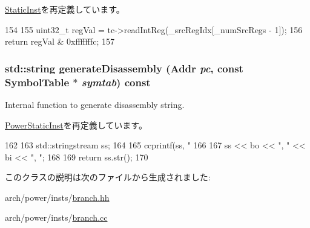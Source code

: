 \hyperlink{classStaticInst_ad126194d9e34405bfc297b8b028f640d}{StaticInst}を再定義しています。


\begin{DoxyCode}
154 {
155     uint32_t regVal = tc->readIntReg(_srcRegIdx[_numSrcRegs - 1]);
156     return regVal & 0xfffffffc;
157 }
\end{DoxyCode}
\hypertarget{classPowerISA_1_1BranchRegCond_a95d323a22a5f07e14d6b4c9385a91896}{
\subsubsection[{generateDisassembly}]{\setlength{\rightskip}{0pt plus 5cm}std::string generateDisassembly ({\bf Addr} {\em pc}, \/  const SymbolTable $\ast$ {\em symtab}) const}}
\label{classPowerISA_1_1BranchRegCond_a95d323a22a5f07e14d6b4c9385a91896}
Internal function to generate disassembly string. 

\hyperlink{classPowerISA_1_1PowerStaticInst_a95d323a22a5f07e14d6b4c9385a91896}{PowerStaticInst}を再定義しています。


\begin{DoxyCode}
162 {
163     std::stringstream ss;
164 
165     ccprintf(ss, "%
166 
167     ss << bo << ", " << bi << ", ";
168 
169     return ss.str();
170 }
\end{DoxyCode}


このクラスの説明は次のファイルから生成されました:\begin{DoxyCompactItemize}
\item 
arch/power/insts/\hyperlink{power_2insts_2branch_8hh}{branch.hh}\item 
arch/power/insts/\hyperlink{branch_8cc}{branch.cc}\end{DoxyCompactItemize}
